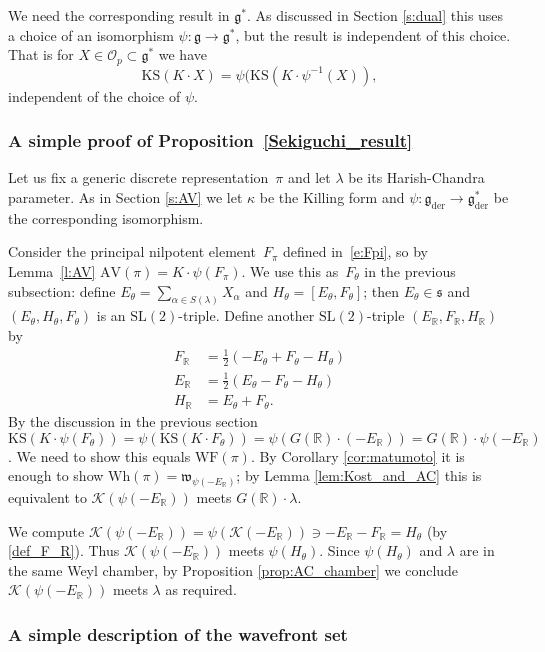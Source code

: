 \documentclass[10pt,leqno]{article}
\numberwithin{equation}{section}
\renewcommand{\O}{\mathcal O}
\newcommand{\R}{\mathbb R}
\newcommand{\K}{\mathcal K}
\newcommand{\g}{\mathfrak g}
\newcommand{\gder}{\mathfrak g_{\mathrm{der}}}
\newcommand\inv{^{-1}}
\newcommand{\s}{\mathfrak s}
\newcommand{\w}{\mathfrak w}
\newcommand{\AV}{\mathrm{AV}}
\newcommand{\KS}{\mathrm{KS}}
\newcommand{\Wh}{\mathrm{Wh}}
\newcommand{\WF}{\mathrm{WF}}
\begin{document}
We need the corresponding result in $\g^*$. As discussed in Section \ref{s:dual} this uses a choice of an isomorphism $\psi\colon \g\to \g^*$, but the result is independent of this choice.
That is for $X\in \O_p\subset \g^*$ we have
$$
\KS(K\cdot X)=\psi(\KS(K\cdot \psi\inv(X)),
$$
independent of the choice of $\psi$.


\subsubsection{A simple proof of Proposition~\ref{Sekiguchi_result}}\label{sec:sekiguchi_proof}

Let us fix a generic discrete representation~$\pi$ and let $\lambda$ be its Harish-Chandra parameter.
As in Section \ref{s:AV} we let $\kappa$ be the Killing form and $\psi\colon\gder\to \gder^*$ be the corresponding isomorphism.

Consider the principal nilpotent element~$F_\pi$ defined in~\eqref{e:Fpi}, so by Lemma~\ref{l:AV} $\AV(\pi)=K\cdot \psi(F_\pi)$. 
We use this as~$F_\theta$ in the previous subsection: define $E_\theta = \sum_{\alpha \in S(\lambda)}X_\alpha$ and $H_\theta  = [E_\theta, F_\theta]$; then $E_\theta \in \s$ and $(E_\theta, H_\theta, F_\theta)$ is an $\mathrm{SL}(2)$-triple. Define another $\mathrm{SL}(2)$-triple $(E_\R, F_\R, H_\R)$ by
\[ \begin{aligned}
  F_\R&=\frac12(-E_\theta+F_\theta-H_\theta)\\
  E_\R&=\frac12(E_\theta-F_\theta-H_\theta)\\
  H_\R&=E_\theta+F_\theta.
\end{aligned}\]
By the discussion in the previous section $\KS(K\cdot \psi(F_\theta))=\psi(\KS(K\cdot F_\theta))=\psi(G(\R)\cdot (-E_\R))=G(\R)\cdot \psi(-E_\R)$.
We need to show this equals $\WF(\pi)$. By Corollary \ref{cor:matumoto} it is enough to show $\Wh(\pi)=\w_{\psi(-E_
  \R)}$; by 
   Lemma \ref{lem:Kost_and_AC} this is equivalent to $\K(\psi(-E_\R))$ meets $G(\R)\cdot\lambda$. 

We compute $\K(\psi(-E_\R))=\psi(\K(-E_\R))\ni -E_\R-F_\R=H_\theta$ (by \eqref{def_F_R}).
Thus $\K(\psi(-E_\R))$ meets $\psi(H_\theta)$. 
Since  $\psi(H_{\theta})$ and $\lambda$ are in the same Weyl chamber, by Proposition \ref{prop:AC_chamber} we conclude 
$\K(\psi(-E_\R))$ meets $\lambda$ as required.

\subsubsection{A simple description of the wavefront set}\label{sec:alternate_WF}
\end{document}
